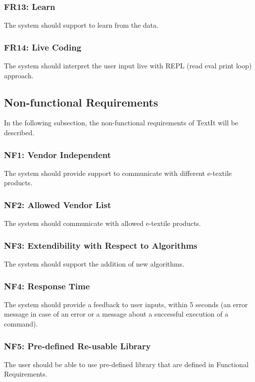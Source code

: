 \subsubsection{FR13: Learn}
The system should support to learn from the data.

\subsubsection{FR14: Live Coding}
The system should interpret the user input live with REPL (read eval print loop) approach.



\subsection{Non-functional Requirements}

In the following subsection, the non-functional requirements of TextIt will be described.

\subsubsection{NF1: Vendor Independent} 
The system should provide support to communicate with different e-textile products.

\subsubsection{NF2: Allowed Vendor List} 
The system should communicate with allowed e-textile products.

\subsubsection{NF3: Extendibility with Respect to Algorithms} 
The system should support the addition of new algorithms.

\subsubsection{NF4: Response Time}
The system should provide a feedback to user inputs, within 5 seconds (an error message in case of an error or a message about a successful execution of a command).

\subsubsection{NF5: Pre-defined Re-usable Library}
The user should be able to use pre-defined library that are defined in Functional Requirements.

